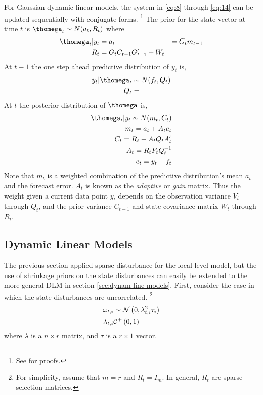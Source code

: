 \documentclass{article}
\begin{document}
For Gaussian dynamic linear models, the system in \eqref{eq:8} through \eqref{eq:14} can be updated sequentially with conjugate forms.%
\footnote{See \textcite[Section 4.3][]{WestHarrison1997} for proofs.}
The prior for the state vector at time $t$ is $\thomega_{t} \sim N(a_{t}, R_{t})$ where
\begin{align}
  \label{eq:13}
  \thomega_{t} | y_{t} &= 
  a_{t} &= G_{t} m_{t-1} \\
  R_{t} &= G_{t} C_{t-1} G'_{t-1} + W_{t}
\end{align}
At $t-1$ the one step ahead predictive distribution of $y_{t}$ is,
\begin{align}
  \label{eq:13}
  y_{t} | \thomega_{t} & \sim N(f_{t}, Q_{t}) \\
  Q_{t} &= 
\end{align}
At $t$ the posterior distribution of $\thomega$ is,
\begin{align}
  \label{eq:15}
  \thomega_{t} | y_{t} \sim N(m_{t}, C_{t}) \\
  m_{t} = a_{t} + A_{t} e_{t} \\
  C_{t} = R_{t} - A_{t} Q_{t} A_{t}' \\
  A_{t} = R_{t} F_{t} Q^{-1}_{t} \\
  e_{t} = y_{t} - f_{t}
\end{align}
Note that $m_{t}$ is a weighted combination of the predictive distribution's mean $a_{t}$ and the forecast error. 
$A_{t}$ is known as the \textit{adaptive} or \textit{gain} matrix.
Thus the weight given a current data point $y_{t}$ depends on the observation variance $V_{t}$ through $Q_{t}$, and the prior variance $C_{t-1}$ and state covariance matrix $W_{t}$ through $R_{t}$.

\subsection{Dynamic Linear Models}
\label{sec:multivariate}

The previous section applied sparse disturbance for the local level model, but the use of shrinkage priors on the state disturbances can easily be extended to the more general DLM in section \ref{sec:dynam-line-models}.
First, consider the case in which the state disturbances are uncorrelated.
\footnote{
  For simplicity, assume that $m = r$ and $R_{t} = I_{m}$.
  In general, $R_{t}$ are sparse selection matrices.
}
\begin{equation}
  \label{eq:20}
  \begin{aligned}[t]
    \omega_{t,i} &\sim \mathcal{N}\left(0, \lambda_{t,i}^{2} \tau_{i}\right) \\
    \lambda_{t,i} & \mathcal{C}^{+}\left(0, 1\right)
  \end{aligned}
\end{equation}
where $\lambda$ is a $n \times r$ matrix, and $\tau$ is a $r \times 1$ vector.
\end{document}
